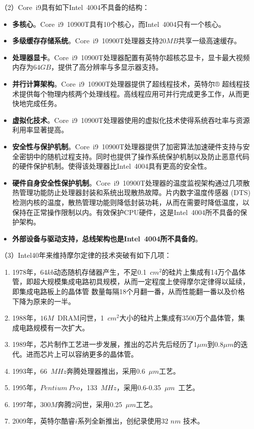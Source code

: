 \documentclass[12pt]{article}
\begin{document}
	（2）Core~i9具有如下Intel~4004不具备的结构：
	\begin{itemize}
		\item \textbf{多核心}。Core~i9~10900T具有10个核心，而Intel~4004只有一个核心。
		\item \textbf{多级缓存存储系统}。Core~i9~10900T处理器支持$20MB$共享一级高速缓存。
		\item \textbf{处理器显卡}。Core~i9~10900T处理器配置有英特尔超核芯显卡，显卡最大视频内存为$64GB$，提供了高分辨率与多显示器支持。
		\item \textbf{并行计算架构}。Core~i9~10900T处理器提供了超线程技术，英特尔® 超线程技术提供每个物理内核两个处理线程。高线程应用可并行完成更多工作，从而更快地完成任务。
		\item \textbf{虚拟化技术}。Core~i9~10900T处理器使用的虚拟化技术使得系统吞吐率与资源利用率显著提高。
		\item \textbf{安全性与保护机制}。Core~i9~10900T处理器提供了加密算法加速硬件支持与安全密钥中的随机过程支持。同时也提供了操作系统保护机制以及防止恶意代码的硬件保护机制。使得该处理器比Intel~4004具有更高的安全性。
		\item \textbf{硬件自身安全性保护机制}。Core~i9~10900T处理器的温度监视架构通过几项散热管理功能防止处理器封装和系统出现散热故障。片内数字温度传感器 (DTS) 检测内核的温度，散热管理功能则降低封装功耗，从而在需要时降低温度，以保持在正常操作限制以内。有效保护CPU硬件，这是Intel~4004所不具备的保护架构。
		\item \textbf{外部设备与驱动支持，总线架构也是Intel~4004所不具备的}。
	\end{itemize}
	（3）Intel40年来维持摩尔定律的技术突破有如下几项：
	\begin{enumerate}
		\item 1978年，$64kb$动态随机存储器产生，不足0.1~$cm^{2}$的硅片上集成有14万个晶体管，即超大规模集成电路初具规模，从而一定程度上使得摩尔定律得以延续，即集成电路板上的晶体管
		数量每隔18个月翻一番，从而性能翻一番以及价格下降为原来的一半。
		\item 1988年，$16M$~DRAM问世，1~$cm^{2}$大小的硅片上集成有3500万个晶体管，集成电路规模有一次扩大。
		\item 1989年，芯片制作工艺进一步发展，推出的芯片先后经历了$1\mu m$到$0.8\mu m$的迭代。进而芯片上可以容纳更多的晶体管。
		\item 1993年，66~$MHz$奔腾处理器推出，采用0.6~$\mu m$工艺。
		\item 1995年，$Pentium ~Pro$，133~$MHz$，采用0.6-0.35~$\mu m$~工艺。
		\item 1997年，300$M$奔腾2问世，采用0.25~$\mu m$工艺。
		\item 2009年，英特尔酷睿$i$系列全新推出，创纪录使用32 $nm$ 技术。
	\end{enumerate}
\end{document}
